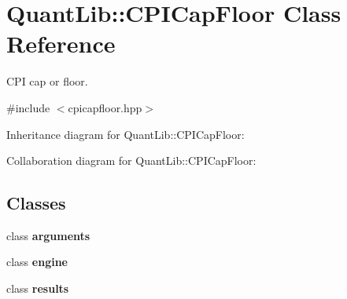 \section{Quant\+Lib\+:\+:C\+P\+I\+Cap\+Floor Class Reference}
\label{class_quant_lib_1_1_c_p_i_cap_floor}


C\+PI cap or floor.  




{\ttfamily \#include $<$cpicapfloor.\+hpp$>$}



Inheritance diagram for Quant\+Lib\+:\+:C\+P\+I\+Cap\+Floor\+:


Collaboration diagram for Quant\+Lib\+:\+:C\+P\+I\+Cap\+Floor\+:
\subsection*{Classes}
\begin{DoxyCompactItemize}
\item 
class {\bf arguments}
\item 
class {\bf engine}
\item 
class {\bf results}
\end{DoxyCompactItemize}
